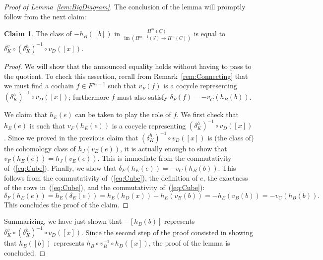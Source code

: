 \documentclass[11pt,a4paper]{amsart}
\theoremstyle{definition}
\newtheorem*{claim}{Claim}
\newcommand{\im}{\operatorname{im}}
\begin{document}
\begin{proof}[Proof of Lemma~\ref{lem:BigDiagram}]
The conclusion of the lemma will promptly follow from the next claim:

\begin{claim}
The class of $-h_B([b])$ in $\frac{ H^m(C)}{\im(H^{m-1}(J) \to  H^m(C))}$ is equal to $\delta_K^v \circ (\delta_K^h)^{-1} \circ v_D([x])$.
\end{claim}
\begin{proof}
We will show that the announced equality holds without having to pass to the quotient. To check this assertion, recall from Remark~\ref{rem:Connecting} that we must find a cochain $f \in F^{m-1}$ such that $v_F(f)$ is a cocycle representing $(\delta_K^h)^{-1} \circ v_D([x])$; furthermore $f$ must also satisfy $\delta_F(f)=-v_C(h_B(b))$. 

We claim that $h_E(e)$ can be taken to play the role of $f$. We first check that $h_E(e)$ is such that $v_F(h_E(e))$ is a cocycle representing $(\delta_K^h)^{-1} \circ v_D([x])$. Since we proved in the previous claim that $(\delta_K^h)^{-1} \circ v_D([x])$ is (the class of) the cohomology class of $h_J(v_E(e))$, it is actually enough to show that $v_F(h_E(e))= h_J(v_E(e))$. This is immediate from the commutativity of~(\ref{eq:Cube}). Finally, we show that $\delta_F(h_E(e))=-v_C(h_B(b))$. This follows from the commutativity of~(\ref{eq:Cube}), the definition of $e$, the exactness of the rows in~(\ref{eq:Cube}), and the commutativity of~(\ref{eq:Cube}):
$$ \delta_F(h_E(e))=h_E(\delta_E(e))=h_E(h_D(x))-h_E(v_B(b)) =-h_E(v_B(b)) =-v_C(h_B(b)).$$
This concludes the proof of the claim.
\end{proof}
Summarizing, we have just shown that $-[h_B(b)]$ represents $\delta_K^v \circ (\delta_K^h)^{-1} \circ v_D([x])$. Since the second step of the proof consisted in showing that $h_B([b])$ represents $h_B \circ v_B^{-1} \circ h_D([x])$, the proof of the lemma is concluded.
\end{proof}




\end{document}

